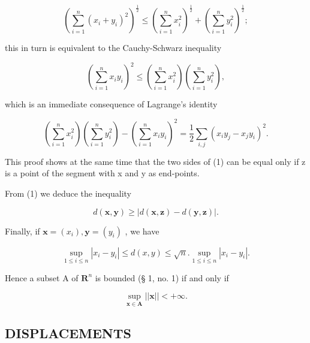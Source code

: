 \[
\left(\sum_ {i = 1} ^ {n} \left(x _ {i} + y _ {i}\right) ^ {2}\right) ^ {\frac {1}{2}} \leqslant \left(\sum_ {i = 1} ^ {n} x _ {i} ^ {2}\right) ^ {\frac {1}{2}} + \left(\sum_ {i = 1} ^ {n} y _ {i} ^ {2}\right) ^ {\frac {1}{2}};
\]

this in turn is equivalent to the Cauchy-Schwarz inequality

\[
\left(\sum_ {i = 1} ^ {n} x _ {i} y _ {i}\right) ^ {2} \leqslant \left(\sum_ {i = 1} ^ {n} x _ {i} ^ {2}\right) \left(\sum_ {i = 1} ^ {n} y _ {i} ^ {2}\right),
\]

which is an immediate consequence of Lagrange's identity

\[
\left(\sum_ {i = 1} ^ {n} x _ {i} ^ {2}\right) \left(\sum_ {i = 1} ^ {n} y _ {i} ^ {2}\right) - \left(\sum_ {i = 1} ^ {n} x _ {i} y _ {i}\right) ^ {2} = \frac {1}{2} \sum_ {i, j} (x _ {i} y _ {j} - x _ {j} y _ {i}) ^ {2}.
\]

This proof shows at the same time that the two sides of (1) can be equal only if z is a point of the segment with x and y as end-points.

From (1) we deduce the inequality

\[
d (\boldsymbol {x}, \boldsymbol {y}) \geqslant | d (\boldsymbol {x}, \boldsymbol {z}) - d (\boldsymbol {y}, \boldsymbol {z}) |.\tag{2}
\]

Finally, if \(\pmb{x} = (x_{i}),\pmb{y} = (y_{i})\) , we have

\[
\sup _ {1 \leqslant i \leqslant n} | x _ {i} - y _ {i} | \leqslant d (x, y) \leqslant \sqrt {n}. \sup _ {1 \leqslant i \leqslant n} | x _ {i} - y _ {i} |.\tag{3}
\]

Hence a subset A of \(\mathbf{R}^n\) is bounded (§ 1, no. 1) if and only if

\[
\sup _ {\boldsymbol {x} \in \mathbf {A}} | | \boldsymbol {x} | | <   + \infty .
\]

\subsection{DISPLACEMENTS}

